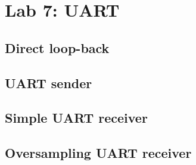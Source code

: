\chapter{Lab 7: UART} \label{day7}

\section{Direct loop-back}



\section{UART sender}





\section{Simple UART receiver}







\section{Oversampling UART receiver}




